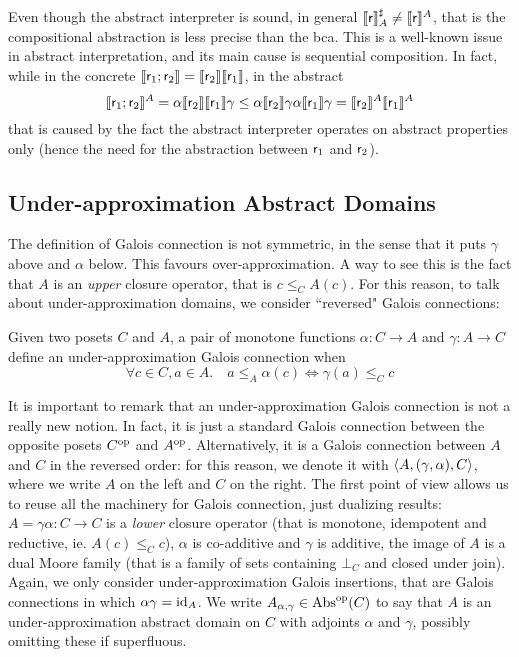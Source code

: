 Even though the abstract interpreter is sound, in general $\llbracket\mathsf{r}\rrbracket^{\sharp}_{A} \neq \llbracket\mathsf{r}\rrbracket^{A}$, that is the compositional abstraction is less precise than the bca. This is a well-known issue in abstract interpretation, and its main cause is sequential composition. In fact, while in the concrete $\llbracket\mathsf{r}_1; \mathsf{r}_2\rrbracket = \llbracket\mathsf{r}_2\rrbracket \llbracket\mathsf{r}_1\rrbracket$, in the abstract
\[
\llbracket\mathsf{r}_1; \mathsf{r}_2\rrbracket^{A} = \alpha \llbracket\mathsf{r}_2\rrbracket \llbracket\mathsf{r}_1\rrbracket \gamma \le \alpha \llbracket\mathsf{r}_2\rrbracket \gamma \alpha \llbracket\mathsf{r}_1\rrbracket \gamma = \llbracket\mathsf{r}_2\rrbracket^{A} \llbracket\mathsf{r}_1\rrbracket^{A}
\]
that is caused by the fact the abstract interpreter operates on abstract properties only (hence the need for the abstraction between $\mathsf{r}_1$ and $\mathsf{r}_2$).

\subsection{Under-approximation Abstract Domains}
The definition of Galois connection is not symmetric, in the sense that it puts $\gamma$ above and $\alpha$ below. This favours over-approximation. A way to see this is the fact that $A$ is an \emph{upper} closure operator, that is $c \le_C A(c)$. For this reason, to talk about under-approximation domains, we consider ``reversed" Galois connections:
\begin{definition}
	Given two posets $C$ and $A$, a pair of monotone functions $\alpha : C \rightarrow A$ and $\gamma : A \rightarrow C$ define an under-approximation Galois connection when
	\[
	\forall c \in C, a \in A.\quad a \le_A \alpha(c) \iff \gamma(a) \le_C c
	\]
\end{definition}
It is important to remark that an under-approximation Galois connection is not a really new notion. In fact, it is just a standard Galois connection between the opposite posets $C^{\text{op}}$ and $A^{\text{op}}$. Alternatively, it is a Galois connection between $A$ and $C$ in the reversed order: for this reason, we denote it with $\langle A, (\gamma, \alpha), C \rangle$, where we write $A$ on the left and $C$ on the right. The first point of view allows us to reuse all the machinery for Galois connection, just dualizing results: $A = \gamma \alpha : C \rightarrow C$ is a \emph{lower} closure operator (that is monotone, idempotent and reductive, ie. $A(c) \le_C c$), $\alpha$ is co-additive and $\gamma$ is additive, the image of $A$ is a dual Moore family (that is a family of sets containing $\bot_C$ and closed under join).
Again, we only consider under-approximation Galois insertions, that are Galois connections in which $\alpha \gamma = \text{id}_A$. We write $A_{\alpha, \gamma} \in \text{\normalfont Abs}^{\text{op}}(C)$ to say that $A$ is an under-approximation abstract domain on $C$ with adjoints $\alpha$ and $\gamma$, possibly omitting these if superfluous.

